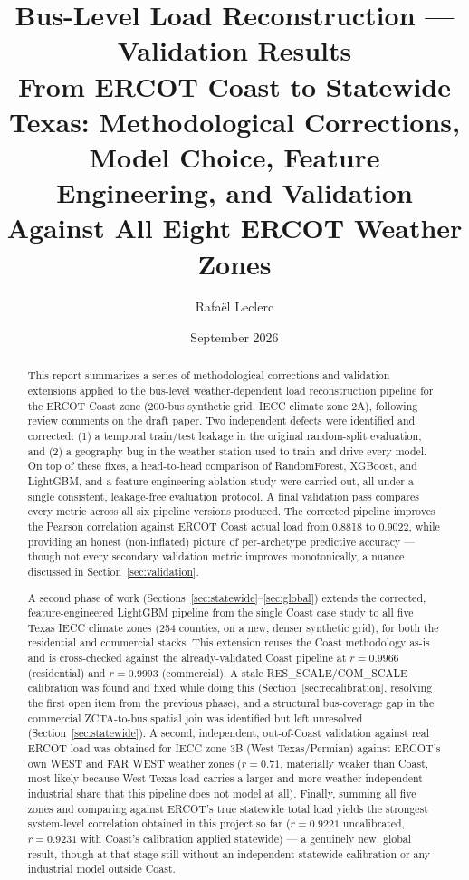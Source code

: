 \documentclass[11pt]{article}
\title{Bus-Level Load Reconstruction --- Validation Results\\
\large From ERCOT Coast to Statewide Texas: Methodological Corrections, Model Choice,
Feature Engineering, and Validation Against All Eight ERCOT Weather Zones}
\author{Rafa\"el Leclerc}
\date{September 2026}
\begin{document}
\maketitle\vspace{-1.5em}

\begin{abstract}
\small
This report summarizes a series of methodological corrections and validation extensions
applied to the bus-level weather-dependent load reconstruction pipeline for the ERCOT
Coast zone (200-bus synthetic grid, IECC climate zone 2A), following review comments on
the draft paper. Two independent defects were identified and corrected: (1) a temporal
train/test leakage in the original random-split evaluation, and (2) a geography bug in
the weather station used to train and drive every model. On top of these fixes, a
head-to-head comparison of RandomForest, XGBoost, and LightGBM, and a feature-engineering
ablation study were carried out, all under a single consistent, leakage-free evaluation
protocol. A final validation pass compares every metric across all six pipeline versions
produced. The corrected pipeline improves the Pearson correlation against ERCOT Coast
actual load from 0.8818 to 0.9022, while providing an honest (non-inflated) picture of
per-archetype predictive accuracy --- though not every secondary validation metric improves
monotonically, a nuance discussed in Section~\ref{sec:validation}.

A second phase of work (Sections~\ref{sec:statewide}--\ref{sec:global}) extends the
corrected, feature-engineered LightGBM pipeline from the single Coast case study to all
five Texas IECC climate zones (254 counties, on a new, denser synthetic grid), for both
the residential and commercial stacks. This extension reuses the Coast
methodology as-is and is cross-checked against the already-validated Coast pipeline at
$r=0.9966$ (residential) and $r=0.9993$ (commercial). A stale RES\_SCALE/COM\_SCALE calibration was found and
fixed while doing this (Section~\ref{sec:recalibration}, resolving the first open item
from the previous phase), and a structural bus-coverage gap in the commercial
ZCTA-to-bus spatial join was identified but left unresolved
(Section~\ref{sec:statewide}). A second, independent, out-of-Coast validation against real
ERCOT load was obtained for IECC zone 3B (West Texas/Permian) against ERCOT's own WEST and
FAR WEST weather zones ($r=0.71$, materially weaker than Coast, most likely because West
Texas load carries a larger and more weather-independent industrial share that this
pipeline does not model at all). Finally, summing all five zones and comparing against
ERCOT's true statewide total load yields the strongest system-level correlation obtained
in this project so far ($r=0.9221$ uncalibrated, $r=0.9231$ with Coast's calibration
applied statewide) --- a genuinely new, global result, though at that stage still without
an independent statewide calibration or any industrial model outside Coast.


\end{abstract}
\end{document}
